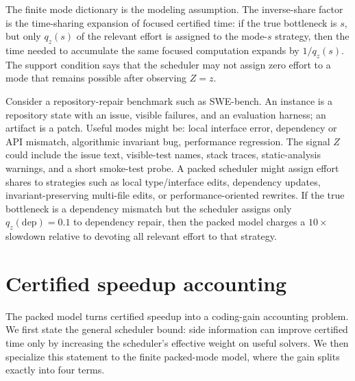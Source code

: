 \documentclass{article}
\newcounter{algorithm}
\begin{document}
The finite mode dictionary is the modeling assumption.  The inverse-share factor is the
time-sharing expansion of focused certified time: if the true bottleneck is \(s\), but only
\(q_z(s)\) of the relevant effort is assigned to the mode-\(s\) strategy, then the time needed
to accumulate the same focused computation expands by \(1/q_z(s)\).
The support condition says that the scheduler may not assign zero effort to a mode that
remains possible after observing \(Z=z\).

Consider a repository-repair benchmark such as SWE-bench.  An instance is a repository
state with an issue, visible failures, and an evaluation harness; an artifact is a patch.
Useful modes might be: local interface error, dependency or API mismatch, algorithmic invariant bug, performance regression.
The signal \(Z\) could include the issue text, visible-test names, stack traces, static-analysis
warnings, and a short smoke-test probe.  A packed scheduler might assign effort shares to
strategies such as local type/interface edits, dependency updates, invariant-preserving
multi-file edits, or performance-oriented rewrites.  If the true bottleneck is a dependency
mismatch but the scheduler assigns only \(q_z(\mathrm{dep})=0.1\) to dependency repair,
then the packed model charges a \(10\times\) slowdown relative to devoting all relevant
effort to that strategy.

\section{Certified speedup accounting}
\label{sec:accounting}

The packed model turns certified speedup into a coding-gain accounting problem.
We first state the general scheduler bound: side information can improve certified time
only by increasing the scheduler's effective weight on useful solvers.  We then specialize
this statement to the finite packed-mode model, where the gain splits exactly into four terms.
\end{document}
